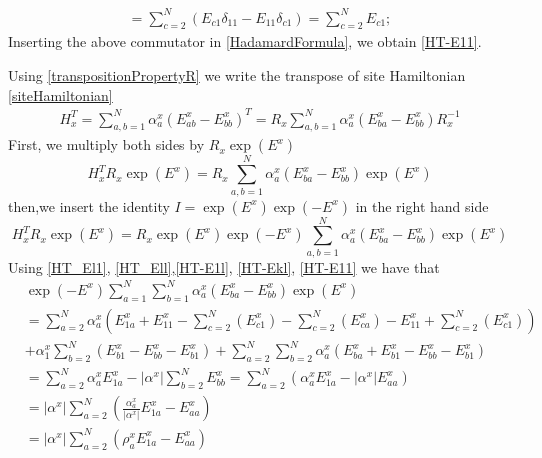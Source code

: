 \documentclass[10pt]{article}
\numberwithin{equation}{section}
\numberwithin{equation}{subsection}
\begin{document}
\begin{enumerate}
\begin{align*}
[E,E_{11}]=\sum_{c=2}^{N}\left(E_{c1}\delta_{11}-E_{1 1}\delta_{c1}\right)=\sum_{c=2}^{N}E_{c1};
\end{align*}
  Inserting the above commutator in \eqref{HadamardFormula}, we obtain \eqref{HT-E11}.
\end{enumerate}
Using \eqref{transpositionPropertyR} we write the transpose of site Hamiltonian \eqref{siteHamiltonian} 
\begin{equation}
    \begin{split}
H_{x}^{T}=\sum_{a,b=1}^{N}\alpha_{a}^{x}\left(E_{ab}^{x}-E_{bb}^{x}\right)^{T}=R_{x}\sum_{a,b=1}^{N}\alpha_{a}^{x}\left(E_{b a}^{x}-E_{bb}^{x}\right)R_{x}^{-1}
    \end{split}
\end{equation}
First, we multiply both sides by $R_{x}\exp{(E^{x})}$
\begin{equation}
    H_{x}^{T}R_{x}\exp{(E^{x})}=R_{x}\sum_{a,b =1}^{N}\alpha_{a}^{x}\left(E_{b a}^{x}-E_{bb}^{x}\right)\exp{(E^{x})}
\end{equation}
then,we insert the identity $I=\exp{(E^{x})}\exp{(-E^{x})}$ in the right hand side
\begin{equation}\label{intermediateTransposeSite}
H_{x}^{T}R_{x}\exp{(E^{x})}=R_{x}\exp{(E^{x})}\exp{(-E^{x})}\sum_{a,b=1}^{N}\alpha_{a}^{x}\left(E_{b a}^{x}-E_{bb}^{x}\right)\exp{(E^{x})}
\end{equation}
 Using \eqref{HT_El1}, \eqref{HT_Ell},\eqref{HT-E1l}, \eqref{HT-Ekl}, \eqref{HT-E11} we have that 
\begin{align}
    &\exp{(-E^{x})}\sum_{a=1}^{N}\sum_{b=1}^{N}\alpha_{a}^{x}\left(E_{b a}^{x}-E_{bb}^{x}\right)\exp{(E^{x})}\nonumber
    \\&=\nonumber
    \sum_{a=2}^{N}\alpha_{a}^{x}\left(E_{1a}^{x}+E_{11}^{x}-\sum_{c=2}^{N}(E_{c1}^{x})-\sum_{c=2}^{N}(E_{ca}^{x})-E_{11}^{x}+
    \sum_{c=2}^{N}(E_{c1}^{x})\right)
    \\&+\nonumber
    \alpha_{1}^{x}\sum_{b=2}^{N}\left(E_{b1}^{x}-E_{bb}^{x}-E_{b1}^{x}\right)+\sum_{a=2}^{N}\sum_{b=2}^{N}\alpha_{a}^{x}\left(E_{ba}^{x}+E_{b1}^{x}-E_{bb}^{x}-E_{b1}^{x}\right)
    \\&=\nonumber
    \sum_{a=2}^{N}\alpha_{a}^{x}E_{1a}^{x}-|\alpha^{x}|\sum_{b=2}^{N}E_{bb}^{x}=
    \sum_{a=2}^{N}\left(\alpha_{a}^{x}E_{1a}^{x}-|\alpha^{x}|E_{aa}^{x}\right)
    \\&=\nonumber
    |\alpha^{x}|\sum_{a=2}^{N}\left(\frac{\alpha_{a}^{x}}{|\alpha^{x}|}E_{1a}^{x}-E_{aa}^{x}\right)
    \\&=
    |\alpha^{x}|\sum_{a=2}^{N}\left(\rho_{a}^{x}E_{1a}^{x}-E_{aa}^{x}\right)
 \end{align}
\end{document}
